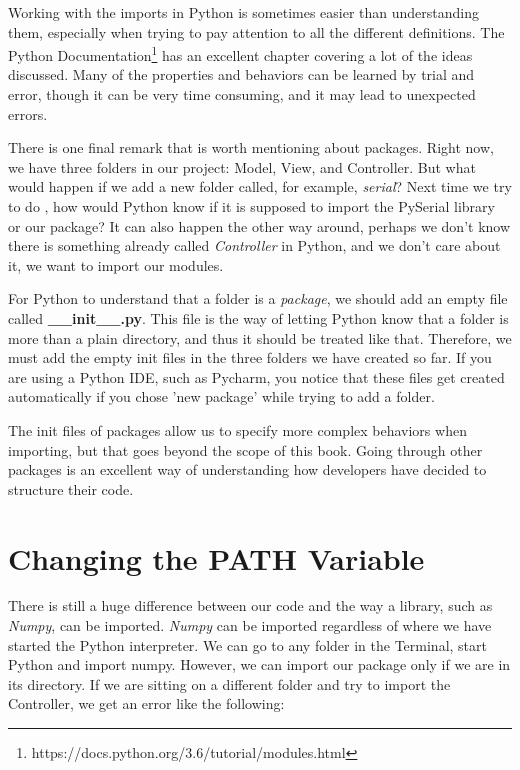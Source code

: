 Working with the imports in Python is sometimes easier than understanding them, especially when trying to pay attention to all the different definitions. The Python Documentation\footnote{https://docs.python.org/3.6/tutorial/modules.html} has an excellent chapter covering a lot of the ideas discussed. Many of the properties and behaviors can be learned by trial and error, though it can be very time consuming, and it may lead to unexpected errors.

There is one final remark that is worth mentioning about packages. Right now, we have three folders in our project: Model, View, and Controller. But what would happen if we add a new folder called, for example, \emph{serial}? Next time we try to do , how would Python know if it is supposed to import the PySerial library or our package? It can also happen the other way around, perhaps we don't know there is something already called \emph{Controller} in Python, and we don't care about it, we want to import our modules.

For Python to understand that a folder is a \emph{package}, we should add an empty file called \textbf{\_\_init\_\_.py}. This file is the way of letting Python know that a folder is more than a plain directory, and thus it should be treated like that. Therefore, we must add the empty init files in the three folders we have created so far. If you are using a Python IDE, such as Pycharm, you notice that these files get created automatically if you chose 'new package' while trying to add a folder.


The init files of packages allow us to specify more complex behaviors when importing, but that goes beyond the scope of this book. Going through other packages is an excellent way of understanding how developers have decided to structure their code.

\section{Changing the PATH Variable}\label{sec:path}
There is still a huge difference between our code and the way a library, such as \emph{Numpy}, can be imported. \emph{Numpy} can be imported regardless of where we have started the Python interpreter. We can go to any folder in the Terminal, start Python and import numpy. However, we can import our package only if we are in its directory. If we are sitting on a different folder and try to import the Controller, we get an error like the following:

